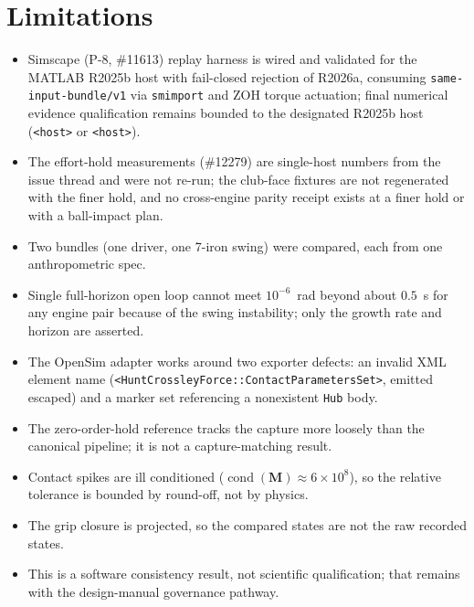 \documentclass[11pt,a4paper]{article}
\newcommand{\bM}{\mathbf{M}}
\begin{document}
\section{Limitations}
\begin{itemize}[nosep]
\item Simscape (P-8, \#11613) replay harness is wired and validated for the MATLAB R2025b host with fail-closed rejection of R2026a, consuming \texttt{same-input-bundle/v1} via \texttt{smimport} and ZOH torque actuation; final numerical evidence qualification remains bounded to the designated R2025b host (\texttt{<host>} or \texttt{<host>}).
\item The effort-hold measurements (\#12279) are single-host numbers from the
  issue thread and were not re-run; the club-face fixtures are not regenerated
  with the finer hold, and no cross-engine parity receipt exists at a finer
  hold or with a ball-impact plan.
\item Two bundles (one driver, one 7-iron swing) were compared, each from one
  anthropometric spec.
\item Single full-horizon open loop cannot meet $10^{-6}$~rad beyond about
  $0.5$~s for any engine pair because of the swing instability; only the
  growth rate and horizon are asserted.
\item The OpenSim adapter works around two exporter defects: an invalid XML
  element name (\texttt{<HuntCrossleyForce::ContactParametersSet>}, emitted
  escaped) and a marker set referencing a nonexistent \texttt{Hub} body.
\item The zero-order-hold reference tracks the capture more loosely than the
  canonical pipeline; it is not a capture-matching result.
\item Contact spikes are ill conditioned ($\operatorname{cond}(\bM)\approx6\times10^{8}$),
  so the relative tolerance is bounded by round-off, not by physics.
\item The grip closure is projected, so the compared states are not the raw
  recorded states.
\item This is a software consistency result, not scientific qualification;
  that remains with the design-manual governance pathway.
\end{itemize}
\end{document}
